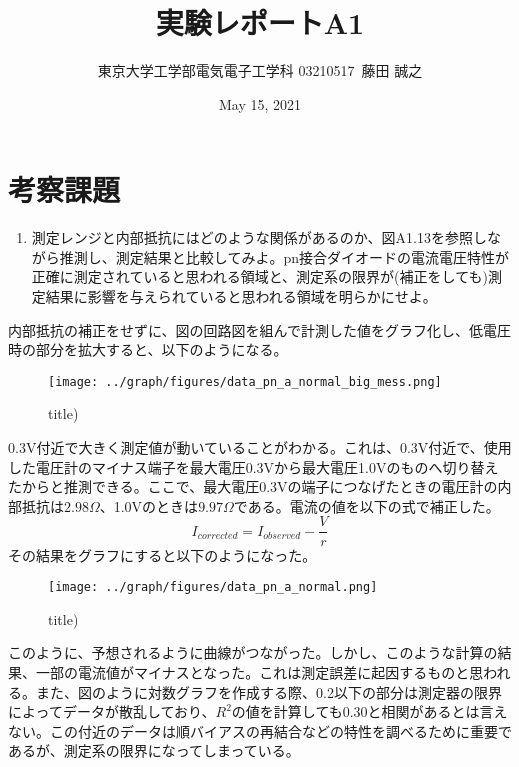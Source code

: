 \documentclass[a4j,dvipdfmx]{article}
\title{実験レポートA1}
\author{東京大学工学部電気電子工学科 03210517\ 藤田 誠之 }
\date{May 15, 2021}
\begin{document}

\maketitle

\section{考察課題}

\begin{enumerate}[label={(\arabic*)}]
  \item 測定レンジと内部抵抗にはどのような関係があるのか、図A1.13を参照しながら推測し、測定結果と比較してみよ。pn接合ダイオードの電流電圧特性が正確に測定されていると思われる領域と、測定系の限界が(補正をしても)測定結果に影響を与えられていると思われる領域を明らかにせよ。
\end{enumerate}
内部抵抗の補正をせずに、図の回路図を組んで計測した値をグラフ化し、低電圧時の部分を拡大すると、以下のようになる。
\begin{figure}[H]
  \begin{center}
  \texttt{[image: ../graph/figures/data\_pn\_a\_normal\_big\_mess.png]}
  \caption{title)}
  \end{center}
\end{figure}

0.3V付近で大きく測定値が動いていることがわかる。これは、0.3V付近で、使用した電圧計のマイナス端子を最大電圧0.3Vから最大電圧1.0Vのものへ切り替えたからと推測できる。ここで、最大電圧0.3Vの端子につなげたときの電圧計の内部抵抗は$2.98\Omega$、1.0Vのときは$9.97\Omega$である。電流の値を以下の式で補正した。
$$
I_{corrected} = I_{observed} - \frac{V}{r}
$$
その結果をグラフにすると以下のようになった。

\begin{figure}[H]
  \begin{center}
  \texttt{[image: ../graph/figures/data\_pn\_a\_normal.png]}
  \caption{title)}
  \end{center}
\end{figure}

このように、予想されるように曲線がつながった。しかし、このような計算の結果、一部の電流値がマイナスとなった。これは測定誤差に起因するものと思われる。また、図のように対数グラフを作成する際、0.2以下の部分は測定器の限界によってデータが散乱しており、$R^2$の値を計算しても0.30と相関があるとは言えない。この付近のデータは順バイアスの再結合などの特性を調べるために重要であるが、測定系の限界になってしまっている。
\end{document}
